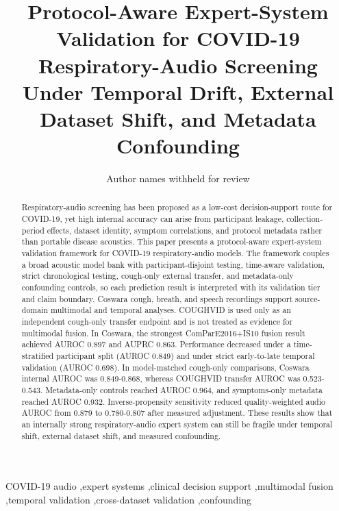 \documentclass[preprint,12pt]{elsarticle}
\begin{document}
\begin{frontmatter}

\title{Protocol-Aware Expert-System Validation for COVID-19 Respiratory-Audio Screening Under Temporal Drift, External Dataset Shift, and Metadata Confounding}

\author[inst1]{Author names withheld for review}
\address[inst1]{Institutional affiliation withheld for review}

\begin{abstract}
Respiratory-audio screening has been proposed as a low-cost decision-support route for COVID-19, yet high internal accuracy can arise from participant leakage, collection-period effects, dataset identity, symptom correlations, and protocol metadata rather than portable disease acoustics. This paper presents a protocol-aware expert-system validation framework for COVID-19 respiratory-audio models. The framework couples a broad acoustic model bank with participant-disjoint testing, time-aware validation, strict chronological testing, cough-only external transfer, and metadata-only confounding controls, so each prediction result is interpreted with its validation tier and claim boundary. Coswara cough, breath, and speech recordings support source-domain multimodal and temporal analyses. COUGHVID is used only as an independent cough-only transfer endpoint and is not treated as evidence for multimodal fusion. In Coswara, the strongest ComParE2016+IS10 fusion result achieved AUROC 0.897 and AUPRC 0.863. Performance decreased under a time-stratified participant split (AUROC 0.849) and under strict early-to-late temporal validation (AUROC 0.698). In model-matched cough-only comparisons, Coswara internal AUROC was 0.849-0.868, whereas COUGHVID transfer AUROC was 0.523-0.543. Metadata-only controls reached AUROC 0.964, and symptoms-only metadata reached AUROC 0.932. Inverse-propensity sensitivity reduced quality-weighted audio AUROC from 0.879 to 0.780-0.807 after measured adjustment. These results show that an internally strong respiratory-audio expert system can still be fragile under temporal shift, external dataset shift, and measured confounding.
\end{abstract}

\begin{keyword}
COVID-19 audio \sep expert systems \sep clinical decision support \sep multimodal fusion \sep temporal validation \sep cross-dataset validation \sep confounding
\end{keyword}

\end{frontmatter}
\end{document}
